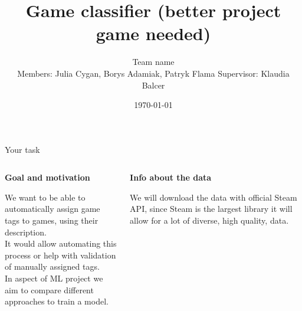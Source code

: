 \documentclass{beamer}
\title{Game classifier (better project game needed)}
\author[Team name]{Team name\\[5mm]
{\small Members: Julia Cygan, Borys Adamiak, Patryk Flama}
\hspace{18mm} 
{\small Supervisor: Klaudia Balcer}}
\institute{UWr}
\date{\today}
\begin{document}
\begin{frame}
\titlepage
\end{frame}


\begin{frame}[t]{Your task}

\begin{columns}
\begin{column}[t]{0.5\textwidth}

{\bf Goal and motivation}

We want to be able to automatically assign game tags to games, using their description. \\
It would allow automating this process or help with validation of manually assigned tags. \\
In aspect of ML project we aim to compare different approaches to train a model.

\end{column}
\begin{column}[t]{0.5\textwidth}

{\bf Info about the data}

We will download the data with official Steam API, since Steam is the largest library it will allow for a lot of diverse, high quality, data.

\end{column}
\end{columns}

\end{frame}
\end{document}
